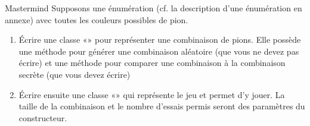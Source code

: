 \begin{Exercice}{Mastermind}
	\medskip
	Supposons une énumération 
	(cf. la description d'une énumération en annexe) 
	avec toutes les couleurs possibles de pion.

	\begin{enumerate}[label=\alph*)]
		\item
			Écrire une classe «» pour
			représenter une combinaison de  pions. Elle
			possède une méthode pour générer une combinaison aléatoire (que vous ne
			devez pas écrire) et une méthode pour comparer une combinaison à la
			combinaison secrète (que vous devez écrire)
		\item
			Écrire ensuite une classe «» qui
			représente le jeu et permet d’y jouer. La taille de la combinaison et
			le nombre d’essais permis seront des paramètres du constructeur.
	\end{enumerate}
\end{Exercice}





